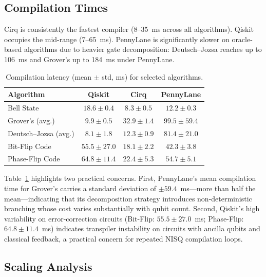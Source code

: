 \subsection{Compilation Times}

Cirq is consistently the fastest compiler (8--35~ms across all
algorithms).
Qiskit occupies the mid-range (7--65~ms).
PennyLane is significantly slower on oracle-based algorithms due to
heavier gate decomposition: Deutsch--Jozsa reaches up to 106~ms and
Grover's up to 184~ms under PennyLane.

\begin{table}[t]
\caption{Compilation latency (mean $\pm$ std, ms) for selected
  algorithms.}
\label{tab:compile}
\centering
\begin{tabular}{lccc}
\toprule
\textbf{Algorithm}     & \textbf{Qiskit}  & \textbf{Cirq}    & \textbf{PennyLane} \\
\midrule
Bell State             & $18.6 \pm 0.4$   & $8.3  \pm 0.5$   & $12.2 \pm 0.3$  \\
Grover's (avg.)        & $9.9  \pm 0.5$   & $32.9 \pm 1.4$   & $99.5 \pm 59.4$ \\
Deutsch--Jozsa (avg.)  & $8.1  \pm 1.8$   & $12.3 \pm 0.9$   & $81.4 \pm 21.0$ \\
Bit-Flip Code          & $55.5 \pm 27.0$  & $18.1 \pm 2.2$   & $42.3 \pm 3.8$  \\
Phase-Flip Code        & $64.8 \pm 11.4$  & $22.4 \pm 5.3$   & $54.7 \pm 5.1$  \\
\bottomrule
\end{tabular}
\end{table}

Table~\ref{tab:compile} highlights two practical concerns.
First, PennyLane's mean compilation time for Grover's carries a standard
deviation of $\pm 59.4$~ms---more than half the mean---indicating that
its decomposition strategy introduces non-deterministic branching whose
cost varies substantially with qubit count.
Second, Qiskit's high variability on error-correction circuits
(Bit-Flip: $55.5 \pm 27.0$~ms; Phase-Flip: $64.8 \pm 11.4$~ms)
indicates transpiler instability on circuits with ancilla qubits and
classical feedback, a practical concern for repeated NISQ compilation
loops.

\subsection{Scaling Analysis}

